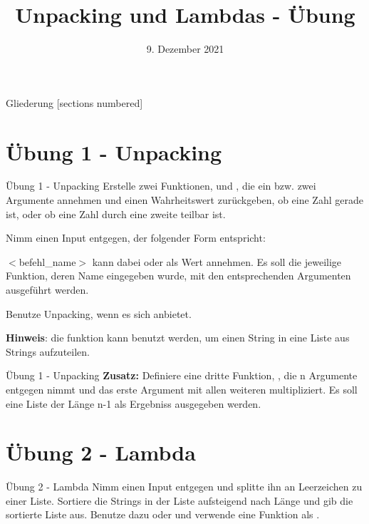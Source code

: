



\title{Unpacking und Lambdas - Übung}
\date{9. Dezember 2021}


\maketitle

\begin{frame}{Gliederung}
	[sections numbered]
	\tableofcontents
\end{frame}

\section{Übung 1 - Unpacking}
\begin{frame}{Übung 1 - Unpacking}
	Erstelle zwei Funktionen,  und , die ein bzw. zwei Argumente annehmen und einen Wahrheitswert zurückgeben, ob eine Zahl gerade ist, oder ob eine Zahl durch eine zweite teilbar ist.
	
	Nimm einen Input entgegen, der folgender Form entspricht:
	
	
	$<$befehl\_name$>$ kann dabei  oder  als Wert annehmen.
	Es soll die jeweilige Funktion, deren Name eingegeben wurde, mit den entsprechenden Argumenten ausgeführt werden.
	
	Benutze \alert{Unpacking}, wenn es sich anbietet.
	
	\textbf{Hinweis}: die  funktion kann benutzt werden, um einen String in eine Liste aus Strings aufzuteilen.
\end{frame}
\begin{frame}{Übung 1 - Unpacking}
	\textbf{Zusatz:}
	Definiere eine dritte Funktion, , die n Argumente entgegen nimmt und das erste Argument mit allen weiteren multipliziert. Es soll eine Liste der Länge n-1 als Ergebniss ausgegeben werden.
\end{frame}

\section{Übung 2 - Lambda}
\begin{frame}{Übung 2 - Lambda}
	Nimm einen Input entgegen und splitte ihn an Leerzeichen zu einer Liste. Sortiere die Strings in der Liste aufsteigend nach Länge und gib die sortierte Liste aus.
	Benutze dazu  oder  und verwende eine  Funktion als .
\end{frame}


